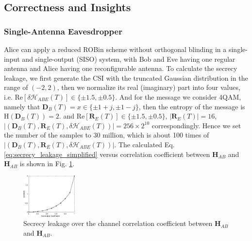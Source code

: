 \subsection{Correctness and Insights}
\label{sec:theo2}
\subsubsection{Single-Antenna Eavesdropper}
Alice can apply a reduced ROBin scheme without orthogonal blinding in a single-input and single-output (SISO) system, with Bob and Eve having one regular antenna and Alice having one reconfigurable antenna. To calculate the secrecy leakage, we first generate the CSI with the truncated Gaussian distribution in the range of $(-2,2)$, then we normalize its real (imaginary) part into four values, i.e. $\text{Re}[\delta \mathcal{H}_{ABE}(T)] \in \{\pm1.5,\pm0.5\}$. And for the message we consider 4QAM, namely that $\mathbf{D}_B(T) = x \in \{\pm1 + j, \pm 1 - j\}$, then the entropy of the message is $\mathrm{H}(\mathbf{D}_B(T)) = 2$. and $\text{Re}[\mathbf{R}_E(T)] \in \{\pm1.5,\pm0.5\}$, $|\mathbf{R}_E(T)| = 16$, $|(\mathbf{D}_B(T),\mathbf{R}_E(T),\delta \mathcal{H}_{ABE}(T))| = 256 \times 2^{10}$ correspondingly. Hence we set the number of the samples to 30 million, which is about 100 times of $|(\mathbf{D}_B(T),\mathbf{R}_E(T),\delta \mathcal{H}_{ABE}(T))|$. The calculated Eq. \ref{eq:secrecy_leakage_simplified} versus correlation coefficient between $\mathbf{H}_{AB}$ and $\mathbf{H}_{AB}$ is 
shown in Fig. \ref{fig:N}.
\begin{figure}[t]
    \centering
    \includegraphics[width=0.25\textwidth]{figs/theory.eps}
    \caption{Secrecy leakage over the channel correlation coefficient between $\mathbf{H}_{AB}$ and $\mathbf{H}_{AB}$.}
    \label{fig:N}
    \vspace{-15pt}
\end{figure}




